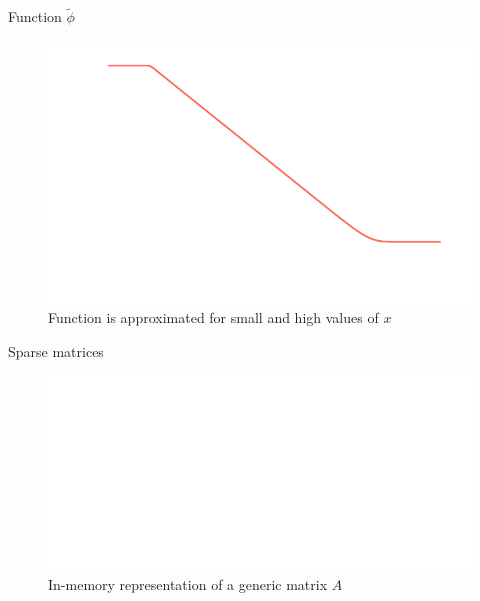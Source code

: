 \documentclass{beamer}
\begin{document}
\begin{darkframes}
  \begin{frame}{Function $\tilde{\phi}$}
    \begin{figure}[h]
      \centering
      \includegraphics[width=\textwidth]{../plots/figures/phi_tilde.pdf}
      \vspace{-1cm}
      \caption{Function is approximated for small and high values of $x$}
      \label{fig:phi_tilde}
    \end{figure}
  \end{frame}

  \begin{frame}{Sparse matrices}
    \begin{figure}[h]
      \centering
      \includegraphics[width=\textwidth]{figures/sparse-matrix.eps}
      \caption{In-memory representation of a generic matrix $A$}
      \label{fig:phi_tilde}
    \end{figure}
  \end{frame}



\end{darkframes}
\end{document}

